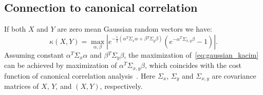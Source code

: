 \documentclass{article}
\begin{document}
\subsection{Connection to canonical correlation}
If both $X$ and $Y$ are zero mean Gaussian random vectors we have:
\begin{equation}
\label{eq:gaussian_kacim}
\kappa(X,Y) = \max_{\alpha, \beta} | e^{-\frac{1}{2} (\alpha^{T}\Sigma_{x}\alpha + \beta{^T}\Sigma_{y}\beta)}(e^{-\alpha{^T}\Sigma_{x,y}\beta} - 1)|.
\end{equation}
Assuming constant $\alpha^{T}\Sigma_{x}\alpha$ and  $\beta{^T}\Sigma_{y}\beta$, the maximization of~\eqref{eq:gaussian_kacim} can be achieved by maximization of  $\alpha{^T}\Sigma_{x,y}\beta$, which coincides with the cost function of canonical correlation analysis~\cite{10.5555/3279302}. Here $\Sigma_{x}$, $\Sigma_{y}$ and  $\Sigma_{x,y}$ are covariance matrices of $X$, $Y$, and $(X,Y)$, respectively. %
\end{document}
